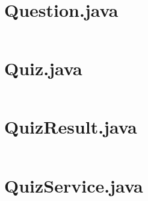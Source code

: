 \documentclass[english,a4paper,]{report}
\begin{document}
\section{Question.java}\label{question.java}

\inputminted{java}{app/models/Question.java}

\section{Quiz.java}\label{quiz.java}

\inputminted{java}{app/models/Quiz.java}

\section{QuizResult.java}\label{quizresult.java}

\inputminted{java}{app/models/QuizResult.java}

\section{QuizService.java}\label{quizservice.java}

\inputminted{java}{app/services/QuizService.java}
\end{document}
